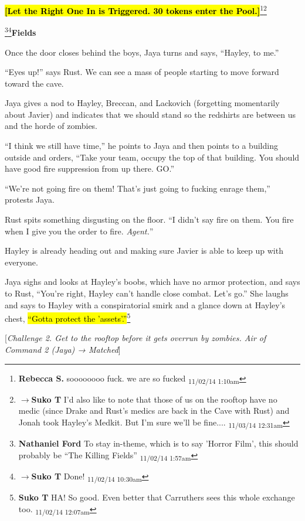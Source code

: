 \textbf{\hl{{[}Let the Right One In is Triggered.  30 tokens enter the Pool.{]}}}\footnote{\textbf{Rebecca S. }soooooooo fuck.
we are so fucked \textsubscript{11/02/14 1:10am}}\footnote{$\rightarrow$\textbf{Suko T }I'd also like to note that those of us on the rooftop have no medic (since Drake and Rust's medics are back in the Cave with Rust) and Jonah took Hayley's Medkit.  But I'm sure we'll be fine.... \textsubscript{11/03/14 12:31am}}




\footnote{\textbf{Nathaniel Ford }To stay in-theme, which is to say 'Horror Film', this should probably be ``The Killing Fields'' \textsubscript{11/02/14 1:57am}}\footnote{$\rightarrow$\textbf{Suko T }Done! \textsubscript{11/02/14 10:30am}}\textbf{Fields}

Once the door closes behind the boys, Jaya turns and says, ``Hayley, to me.''

``Eyes up!'' says Rust.  We can see a mass of people starting to move forward toward the cave.

Jaya gives a nod to Hayley, Breccan, and Lackovich (forgetting momentarily about Javier) and indicates that we should stand so the redshirts are between us and the horde of zombies.

``I think we still have time,'' he points to Jaya and then points to a building outside and orders,  ``Take your team, occupy the top of that building.  You should have good fire suppression from up there.  GO.''

``We're not going fire on them!  That's just going to fucking enrage them,'' protests Jaya.

Rust spits something disgusting on the floor.  ``I didn't say fire on them.  You fire when I give you the order to fire.  \textit{Agent.}''

Hayley is already heading out and making sure Javier is able to keep up with everyone.

Jaya sighs and looks at Hayley's boobs, which have no armor protection, and says to Rust, ``You're right, Hayley can't handle close combat.  Let's go.''  She laughs and says to Hayley with a conspiratorial smirk and a glance down at Hayley's chest, \hl{``Gotta protect the 'assets'.''}\footnote{\textbf{Suko T }HA!  So good. Even better that Carruthers sees this whole exchange too. \textsubscript{11/02/14 12:07am}}

{[}\textit{Challenge 2.  Get to the rooftop before it gets overrun by zombies.  Air of Command 2 (Jaya) → Matched}{]}

